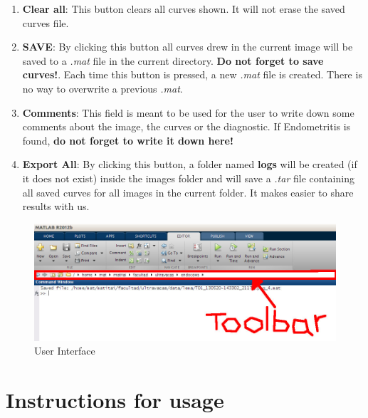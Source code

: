 \documentclass[12pt,a4paper,titlepage]{report}
\begin{document}
\begin{enumerate}
	\item \textbf{Clear all}: This button clears all curves shown. It will not erase the saved curves file.
	\item \textbf{SAVE}: By clicking this button all curves drew in the current image will be saved to a \emph{.mat} file in the current directory. \textbf{Do not forget to save curves!}. Each time this button is pressed, a new \emph{.mat} file is created. There is no way to overwrite a previous \emph{.mat}.
	\item \textbf{Comments}: This field is meant to be used for the user to write down some comments about the image, the curves or the diagnostic. If Endometritis is found, \textbf{do not forget to write it down here!}
	\item \textbf{Export All}: By clicking this button, a folder named \textbf{logs} will be created (if it does not exist) inside the images folder and will save a \emph{.tar} file containing all saved curves for all images in the current folder. It makes easier to share results with us.
\end{enumerate}

\begin{figure}[h!]
	\begin{center}
	\includegraphics[width=.8\textwidth]{toolbar.jpg}
	\end{center}
	\caption{User Interface}
	\label{fig:interfaz}
\end{figure}


\section{Instructions for usage}
\end{document}
